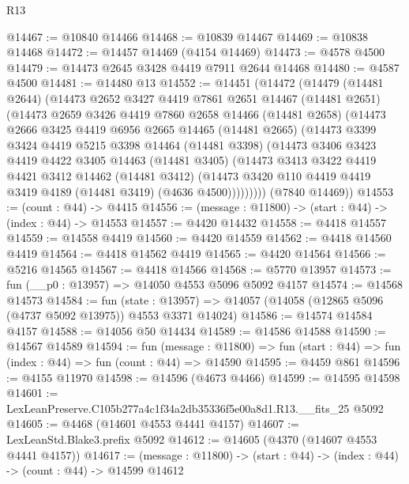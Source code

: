 \begin{lexlean}{R13}
\begin{coremodule}
@14467 := @10840 @14466
@14468 := @10839 @14467
@14469 := @10838 @14468
@14472 := @14457 @14469 (@4154 @14469)
@14473 := @4578 @4500
@14479 := @14473 @2645 @3428 @4419 @7911 @2644 @14468
@14480 := @4587 @4500
@14481 := @14480 @13
@14552 := @14451
    (@14472
      (@14479
        (@14481 @2644)
        (@14473
          @2652
          @3427
          @4419
          @7861
          @2651
          @14467
          (@14481 @2651)
          (@14473
            @2659
            @3426
            @4419
            @7860
            @2658
            @14466
            (@14481 @2658)
            (@14473
              @2666
              @3425
              @4419
              @6956
              @2665
              @14465
              (@14481 @2665)
              (@14473
                @3399
                @3424
                @4419
                @5215
                @3398
                @14464
                (@14481 @3398)
                (@14473
                  @3406
                  @3423
                  @4419
                  @4422
                  @3405
                  @14463
                  (@14481 @3405)
                  (@14473
                    @3413
                    @3422
                    @4419
                    @4421
                    @3412
                    @14462
                    (@14481 @3412)
                    (@14473 @3420 @110 @4419 @4419 @3419 @4189 (@14481 @3419) (@4636 @4500)))))))))
      (@7840 @14469))
@14553 := (count : @44) -> @4415
@14556 := (message : @11800) -> (start : @44) -> (index : @44) -> @14553
@14557 := @4420 @14432
@14558 := @4418 @14557
@14559 := @14558 @4419
@14560 := @4420 @14559
@14562 := @4418 @14560 @4419
@14564 := @4418 @14562 @4419
@14565 := @4420 @14564
@14566 := @5216 @14565
@14567 := @4418 @14566
@14568 := @5770 @13957
@14573 := fun (__p0 : @13957) => @14050 @4553 @5096 @5092 @4157
@14574 := @14568 @14573
@14584 := fun (state : @13957) =>
  @14057 (@14058 (@12865 @5096 (@4737 @5092 @13975)) @4553 @3371 @14024)
@14586 := @14574 @14584 @4157
@14588 := @14056 @50 @14434
@14589 := @14586 @14588
@14590 := @14567 @14589
@14594 := fun (message : @11800) =>
  fun (start : @44) => fun (index : @44) => fun (count : @44) => @14590
@14595 := @4459 @861
@14596 := @4155 @11970
@14598 := @14596 (@4673 @4466)
@14599 := @14595 @14598
@14601 := LexLeanPreserve.C105b277a4c1f34a2db35336f5e00a8d1.R13.__fits_25 @5092
@14605 := @4468 (@14601 @4553 @4441 @4157)
@14607 := LexLeanStd.Blake3.prefix @5092
@14612 := @14605 (@4370 (@14607 @4553 @4441 @4157))
@14617 := (message : @11800) -> (start : @44) -> (index : @44) -> (count : @44) -> @14599 @14612

\end{coremodule}
\end{lexlean}
